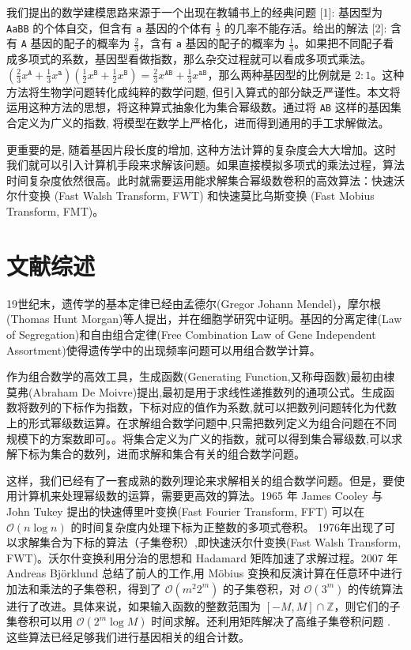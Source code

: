 \documentclass[12pt]{article} %
\begin{document}
我们提出的数学建模思路来源于一个出现在教辅书上的经典问题 [1]: 基因型为 \texttt{AaBB} 的个体自交，但含有 \texttt{a} 基因的个体有 $\frac{1}{2}$ 的几率不能存活。给出的解法 [2]: 含有 \texttt{A} 基因的配子的概率为 $\frac{2}{3}$，含有 \texttt{a} 基因的配子的概率为 $\frac{1}{3}$。如果把不同配子看成多项式的系数，基因型看做指数，那么杂交过程就可以看成多项式乘法。$(\frac{2}{3}x^{\texttt{A}}+\frac{1}{3}x^{\texttt{a}})(\frac{1}{2}x^{\texttt{B}}+\frac{1}{2}x^{\texttt{B}})=\frac{2}{3}x^{\texttt{AB}}+\frac{1}{3}x^{\texttt{aB}}$，那么两种基因型的比例就是 $2 : 1$。这种方法将生物学问题转化成纯粹的数学问题, 但引入算式的部分缺乏严谨性。本文将运用这种方法的思想，将这种算式抽象化为集合幂级数。通过将 \texttt{AB} 这样的基因集合定义为广义的指数, 将模型在数学上严格化，进而得到通用的手工求解做法。

更重要的是, 随着基因片段长度的增加, 这种方法计算的复杂度会大大增加。这时我们就可以引入计算机手段来求解该问题。如果直接模拟多项式的乘法过程，算法时间复杂度依然很高。此时就需要运用能求解集合幂级数卷积的高效算法：快速沃尔什变换 (Fast Walsh Transform, FWT) 和快速莫比乌斯变换 (Fast Mobius Transform, FMT)。

\section{文献综述}

19世纪末，遗传学的基本定律已经由孟德尔(Gregor Johann Mendel)，摩尔根(Thomas Hunt Morgan)等人提出，并在细胞学研究中证明。基因的分离定律(Law of Segregation)和自由组合定律(Free Combination Law of Gene Independent Assortment)使得遗传学中的出现频率问题可以用组合数学计算。\cite{2009陈阅增普通生物学}

作为组合数学的高效工具，生成函数(Generating Function,又称母函数)最初由棣莫弗(Abraham De Moivre)提出,最初是用于求线性递推数列的通项公式。\cite{knuth2005art}生成函数将数列的下标作为指数，下标对应的值作为系数,就可以把数列问题转化为代数上的形式幂级数运算。在求解组合数学问题中,只需把数列定义为组合问题在不同规模下的方案数即可。\cite{graham1989concrete}。将集合定义为广义的指数，就可以得到集合幂级数,可以求解下标为集合的数列，进而求解和集合有关的组合数学问题。

这样，我们已经有了一套成熟的数列理论来求解相关的组合数学问题。但是，要使用计算机来处理幂级数的运算，需要更高效的算法。1965 年 James Cooley 与 John Tukey 提出的快速傅里叶变换(Fast Fourier Transform, FFT)\cite{cooley1965algorithm} 可以在 $\mathcal{O}(n\log n)$ 的时间复杂度内处理下标为正整数的多项式卷积。
1976年出现了可以求解集合为下标的算法（子集卷积）,即快速沃尔什变换(Fast Walsh Transform, FWT)\cite{maslen1997generalized}。沃尔什变换利用分治的思想和 Hadamard 矩阵加速了求解过程\cite{coppersmith1987matrix}。2007 年 Andreas Björklund 总结了前人的工作,用 Möbius 变换和反演计算在任意环中进行加法和乘法的子集卷积，得到了 $\mathcal{O}(m^2 2^m)$ 的子集卷积，对 $\mathcal{O}(3^m)$ 的传统算法进行了改进。具体来说，如果输入函数的整数范围为 $[-M,M]\cap \mathbb{Z}$，则它们的子集卷积可以用 $\mathcal{O}(2^m\log M)$ 时间求解。还利用矩阵解决了高维子集卷积问题 \cite{10.1145/1250790.1250801}. 这些算法已经足够我们进行基因相关的组合计数。
\end{document}
